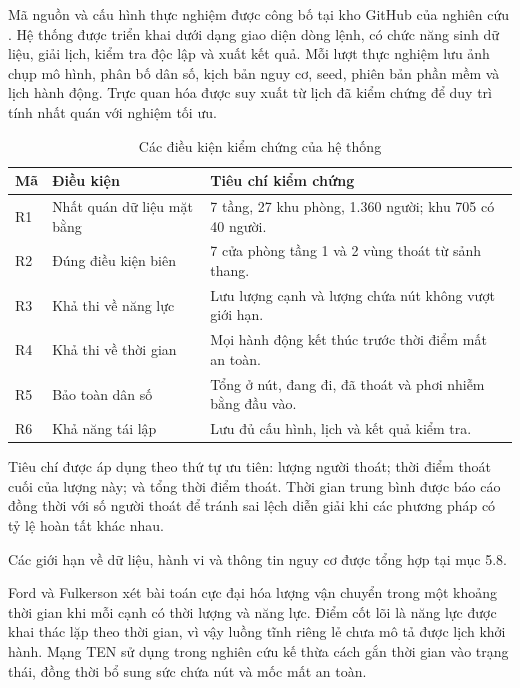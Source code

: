 Mã nguồn và cấu hình thực nghiệm được công bố tại kho GitHub của nghiên cứu \cite{code}. Hệ thống được triển khai dưới dạng giao diện dòng lệnh, có chức năng sinh dữ liệu, giải lịch, kiểm tra độc lập và xuất kết quả. Mỗi lượt thực nghiệm lưu ảnh chụp mô hình, phân bố dân số, kịch bản nguy cơ, seed, phiên bản phần mềm và lịch hành động. Trực quan hóa được suy xuất từ lịch đã kiểm chứng để duy trì tính nhất quán với nghiệm tối ưu.

\begin{table}[htbp]\centering\caption{Các điều kiện kiểm chứng của hệ thống}
\small\begin{tabularx}{\linewidth}{P{1cm}P{4cm}X}\toprule
Mã & Điều kiện & Tiêu chí kiểm chứng\\\midrule
R1 & Nhất quán dữ liệu mặt bằng & 7 tầng, 27 khu phòng, 1.360 người; khu 705 có 40 người.\\
R2 & Đúng điều kiện biên & 7 cửa phòng tầng 1 và 2 vùng thoát từ sảnh thang.\\
R3 & Khả thi về năng lực & Lưu lượng cạnh và lượng chứa nút không vượt giới hạn.\\
R4 & Khả thi về thời gian & Mọi hành động kết thúc trước thời điểm mất an toàn.\\
R5 & Bảo toàn dân số & Tổng ở nút, đang đi, đã thoát và phơi nhiễm bằng đầu vào.\\
R6 & Khả năng tái lập & Lưu đủ cấu hình, lịch và kết quả kiểm tra.\\\bottomrule
\end{tabularx}\end{table}

Tiêu chí được áp dụng theo thứ tự ưu tiên: lượng người thoát; thời điểm thoát cuối của lượng này; và tổng thời điểm thoát. Thời gian trung bình được báo cáo đồng thời với số người thoát để tránh sai lệch diễn giải khi các phương pháp có tỷ lệ hoàn tất khác nhau.

Các giới hạn về dữ liệu, hành vi và thông tin nguy cơ được tổng hợp tại mục 5.8.

Ford và Fulkerson \cite{ford} xét bài toán cực đại hóa lượng vận chuyển trong một khoảng thời gian khi mỗi cạnh có thời lượng và năng lực. Điểm cốt lõi là năng lực được khai thác lặp theo thời gian, vì vậy luồng tĩnh riêng lẻ chưa mô tả được lịch khởi hành. Mạng TEN sử dụng trong nghiên cứu kế thừa cách gắn thời gian vào trạng thái, đồng thời bổ sung sức chứa nút và mốc mất an toàn.

